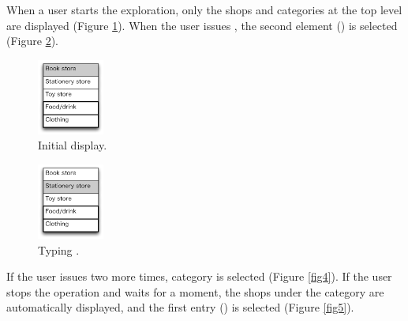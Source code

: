 \documentclass[conference]{IEEEtran}
\def\down{\tsf{▼}}
\begin{document}
When a user starts the exploration, only the shops and categories
at the top level are displayed (Figure \ref{fig2}).
When the user issues {\down},
the second element () is selected (Figure \ref{fig3}).

\def\menuwidth{22mm}

\begin{figure}[H]
\centerline{\includegraphics[width=\menuwidth, bb=0 0 139 157]{figures/fig2.pdf}}
\caption{Initial display.}
\label{fig2}
\end{figure}

\begin{figure}[H]
\centerline{\includegraphics[width=\menuwidth,bb=0 0 139 157]{figures/fig3.pdf}}
\caption{Typing {\down}.}
\label{fig3}
\end{figure}

If the user issues {\down} two more times, 
 category is selected (Figure \ref{fig4}).
If the user stops the operation and waits for a moment, the shops under the 
category are automatically displayed,
and the first entry () is selected (Figure \ref{fig5}).
\end{document}
